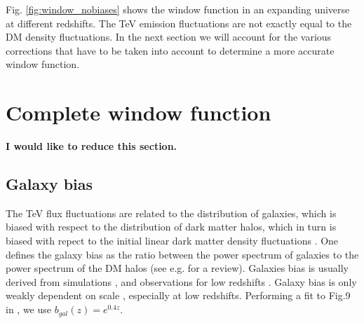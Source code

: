\documentclass[twocolumns]{emulateapj}
\newcommand\ALc[1]{{\color{red} \bf #1}} %
\begin{document}
Fig. \ref{fig:window_nobiases} shows the window function in an expanding universe at different redshifts.  %
The TeV emission fluctuations are not exactly equal to the DM density fluctuations. In the next section we will account for the various corrections that have to be taken into account to determine a more accurate window function.


\section{Complete window function}
\ALc{I would like to reduce this section.}
%
\subsection{Galaxy bias}
The TeV flux fluctuations are related to the distribution of galaxies, which is biased with respect to the distribution of dark matter halos, which in turn is biased with repect to the initial linear dark matter density fluctuations  \citep{1996MNRAS.282..347M}.  One defines the galaxy bias as the ratio between the power spectrum of galaxies to the power spectrum of the DM halos (see e.g. \citep{2002PhR...372....1C} for a review).  Galaxies bias is usually derived from simulations \citep{1999MNRAS.307..529K}, and observations for low redshifts \citep{2004ApJ...606..702T}. Galaxy bias is only weakly dependent on scale \citep{1998MNRAS.293..209M}, especially at low redshifts. Performing  a fit to Fig.9 in \citet{2004ApJ...601....1W}, we use $b_{gal}(z)=e^{0.4z}$. 




\end{document}
